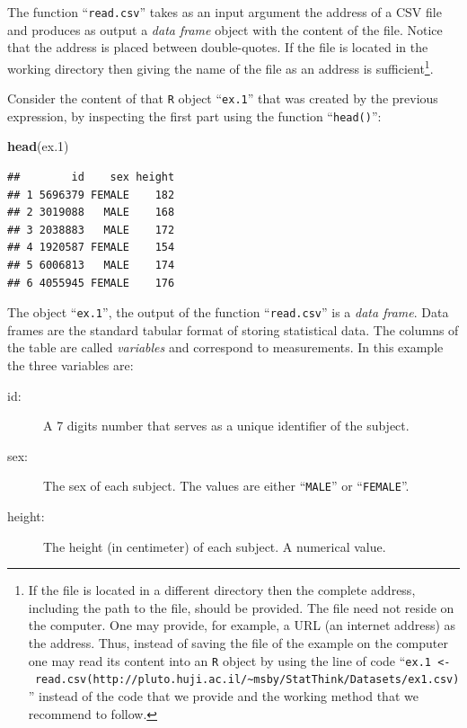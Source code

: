 \documentclass[]{krantz}
\makeatletter
\newenvironment{Shaded}{\begin{snugshade}}{\end{snugshade}}
\newcommand{\FloatTok}[1]{\textcolor[rgb]{0.00,0.00,0.81}{#1}}
\newcommand{\KeywordTok}[1]{\textcolor[rgb]{0.13,0.29,0.53}{\textbf{#1}}}
\newcommand{\NormalTok}[1]{#1}
\newenvironment{kframe}{%
\medskip{}
\setlength{\fboxsep}{.8em}
 \def\at@end@of@kframe{}%
 \ifinner\ifhmode%
  \def\at@end@of@kframe{\end{minipage}}%
  \begin{minipage}{\columnwidth}%
 \fi\fi%
 \def\FrameCommand##1{\hskip\@totalleftmargin \hskip-\fboxsep
 \colorbox{shadecolor}{##1}\hskip-\fboxsep
     \hskip-\linewidth \hskip-\@totalleftmargin \hskip\columnwidth}%
 \MakeFramed {\advance\hsize-\width
   \@totalleftmargin\z@ \linewidth\hsize
   \@setminipage}}%
 {\par\unskip\endMakeFramed%
 \at@end@of@kframe}
\renewenvironment{Shaded}{\begin{kframe}}{\end{kframe}}
\theoremstyle{definition}
\theoremstyle{definition}
\theoremstyle{definition}
\theoremstyle{remark}
\makeatother
\begin{document}
The function ``\texttt{read.csv}'' takes as an input argument the address of a
CSV file and produces as output a \emph{data frame} object with the content
of the file. Notice that the address is placed between double-quotes. If
the file is located in the working directory then giving the name of the
file as an address is sufficient\footnote{If the file is located in a different directory then the complete
  address, including the path to the file, should be provided. The
  file need not reside on the computer. One may provide, for example,
  a URL (an internet address) as the address. Thus, instead of saving
  the file of the example on the computer one may read its content
  into an \texttt{R} object by using the line of code
  ``\texttt{ex.1\ \textless{}-\ read.csv(http://pluto.huji.ac.il/\textasciitilde{}msby/StatThink/Datasets/ex1.csv)}''
  instead of the code that we provide and the working method that we
  recommend to follow.}.

Consider the content of that \texttt{R} object ``\texttt{ex.1}'' that was created by the
previous expression, by inspecting the first part using the function ``\texttt{head()}'':

\begin{Shaded}
\begin{Highlighting}[]
\KeywordTok{head}\NormalTok{(ex}\FloatTok{.1}\NormalTok{)}
\end{Highlighting}
\end{Shaded}

\begin{verbatim}
##        id    sex height
## 1 5696379 FEMALE    182
## 2 3019088   MALE    168
## 3 2038883   MALE    172
## 4 1920587 FEMALE    154
## 5 6006813   MALE    174
## 6 4055945 FEMALE    176
\end{verbatim}

The object ``\texttt{ex.1}'', the output of the function ``\texttt{read.csv}'' is a \emph{data
frame}. Data frames are the standard tabular format of storing
statistical data. The columns of the table are called \emph{variables} and
correspond to measurements. In this example the three variables are:

\begin{description}
\item[id:]
A 7 digits number that serves as a unique identifier of the subject.
\item[sex:]
The sex of each subject. The values are either ``\texttt{MALE}'' or
``\texttt{FEMALE}''.
\item[height:]
The height (in centimeter) of each subject. A numerical value.
\end{description}
\end{document}
